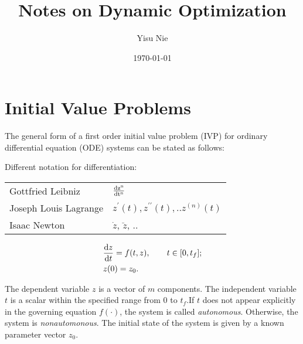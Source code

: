 \documentclass[letterpaper, 11pt]{article}
\author{Yisu Nie}
\date{\today}
\title{Notes on Dynamic Optimization}
\providecommand{\diff}[2]{\ensuremath{\frac{{\rm d} #1}{{\rm d} #2}}}
\providecommand{\note}[1]{\begin{margintable}{\footnotesize #1}\end{margintable}}
\begin{document}
\maketitle

\section{Initial Value Problems}
\label{sec-1}
The general form of a first order initial value problem (IVP) for ordinary differential equation (ODE) systems can be stated as follows:
\note{Different notation for differentiation:}
\begin{margintable}
\footnotesize
\begin{tabular}{ll}
 Gottfried Leibniz & $\frac{\rm dz^{{n}}}{\rm dt^{{n}}}$  \\
 Joseph Louis Lagrange & $z^{\prime}(t), z^{\prime\prime}(t),..z^{(n)}(t)$ \\
 Isaac Newton & $\dot z$, $\ddot z$, ..
\end{tabular}
\end{margintable}

\begin{subequations}
\label{eq:ivp-gen-form-def}
\begin{align}
\label{eq:ivp-gen-form-def-a}
& \diff{z}{t}= f(t,z), \qquad t \in [0,t_{f}]; \\
\label{eq:ivp-gen-form-def-b}
& z(0) = z_{0}. 
\end{align}
\end{subequations}

The dependent variable $z$ is a vector of $m$ components. The independent variable $t$ is a scalar within the specified range from 0 to $t_{f}$.If $t$ does not appear explicitly in
the governing equation $f(\cdot)$, the system is called \emph{autonomous}. Otherwise, the system is \emph{nonautomonous}. The initial state of the system is given by a known
parameter vector $z_0$. 
\end{document}
